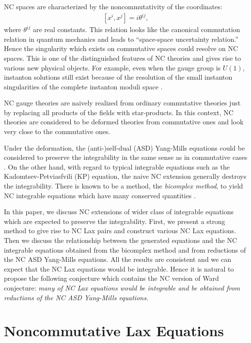 \documentclass[a4paper,12pt]{article}\setlength{\topmargin}{-1cm}
\begin{document}
NC spaces are characterized by the noncommutativity of
the coordinates:
\begin{eqnarray}
\label{nc_coord}
[x^i,x^j]=i\theta^{ij},
\end{eqnarray}
where $\theta^{ij}$ are real constants.  
This relation looks like the canonical commutation
relation in quantum mechanics
and leads to ``space-space uncertainty relation.''
Hence
the singularity which exists on commutative spaces could resolve
on NC spaces.
This is one of the distinguished features of NC theories
and gives rise to various new physical objects.
For example, even when the gauge group is $U(1)$,
instanton solutions still exist \cite{NeSc}
because of the resolution of the small instanton singularities 
of the complete instanton moduli space \cite{Nakajima}.

NC gauge theories are naively realized from
ordinary commutative theories just by replacing
all products of the fields with star-products.
In this context, NC theories are
considered to be deformed theories from commutative ones
and look very close to the commutative ones.

Under the deformation,
the (anti-)self-dual (ASD) Yang-Mills equations
could be considered to preserve the integrability
in the same sense as in commutative cases \cite{KKO, Nekrasov}.
On the other hand, with regard to typical integrable equations
such as the Kadomtsev-Petviasfvili (KP) equation,
the naive NC extension generally destroys the integrability.
There is known to be a method, the {\it bicomplex method}, to yield
NC integrable equations which have many conserved quantities
\cite{Bicomplex, GrPe}.

In this paper, we discuss
NC extensions of wider class of integrable equations
which are expected to preserve the integrability.
First, we present a strong method 
to give rise to NC Lax pairs 
and construct various NC Lax equations.
Then we discuss the relationship between
the generated equations and the NC integrable equations 
obtained from the bicomplex method
and from reductions of the NC ASD Yang-Mills equations.
All the results are consistent and we can expect that 
the NC Lax equations would be integrable. 
Hence it is natural to
propose the following conjecture which contains 
the NC version of Ward conjecture:
{\it many of NC Lax equations would be integrable
and be obtained from reductions of the NC ASD Yang-Mills equations}.

\section{Noncommutative Lax Equations}
\end{document}
